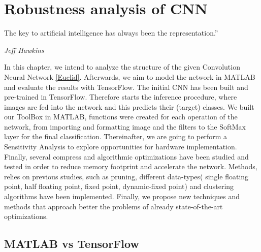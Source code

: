 \chapter{Robustness analysis of CNN} %

\epigraph{The key to artificial intelligence has always been the representation.” }{\textit{Jeff Hawkins}}
\label{Chapter4} %

In this chapter, we intend to analyze the structure of the given Convolution Neural Network \cite{Reference75} \ref{Euclid}. Afterwards, we aim to model the network in MATLAB \cite{Link2} and evaluate the results with TensorFlow. The initial CNN has been built and pre-trained in TensorFlow. Therefore starts the inference procedure, where images are fed into the network and this predicts their (target) classes. We built our ToolBox in MATLAB, functions were created for each operation of the network, from importing and formatting image and the filters to the SoftMax layer for the final classification. Thereinafter, we are going to perform a Sensitivity Analysis to explore opportunities for hardware implementation. Finally, several compress and algorithmic optimizations have been studied and tested in order to reduce memory footprint and accelerate the network. Methods, relies on previous studies, such as pruning, different data-types( single floating point, half floating point, fixed point, dynamic-fixed point) and clustering algorithms have been implemented. Finally, we propose new techniques and methods that approach better the problems of already state-of-the-art optimizations.


     




\section{MATLAB vs TensorFlow}

